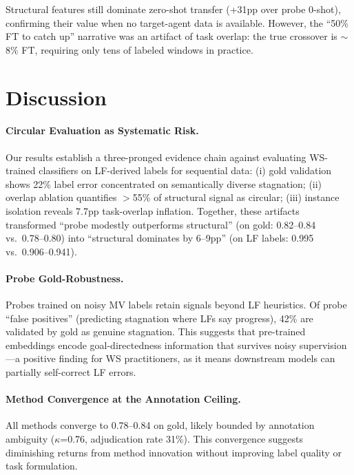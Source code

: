 \documentclass[11pt,a4paper]{article}
\begin{document}
Structural features still dominate zero-shot transfer (+31pp over probe 0-shot), confirming their value when no target-agent data is available.
However, the ``50\% FT to catch up'' narrative was an artifact of task overlap: the true crossover is $\sim$8\% FT, requiring only tens of labeled windows in practice.

\section{Discussion}
\label{sec:discussion}

\paragraph{Circular Evaluation as Systematic Risk.}
Our results establish a three-pronged evidence chain against evaluating WS-trained classifiers on LF-derived labels for sequential data:
(i) gold validation shows 22\% label error concentrated on semantically diverse stagnation;
(ii) overlap ablation quantifies $>$55\% of structural signal as circular;
(iii) instance isolation reveals 7.7pp task-overlap inflation.
Together, these artifacts transformed ``probe modestly outperforms structural'' (on gold: 0.82--0.84 vs.\ 0.78--0.80) into ``structural dominates by 6--9pp'' (on LF labels: 0.995 vs.\ 0.906--0.941).

\paragraph{Probe Gold-Robustness.}
Probes trained on noisy MV labels retain signals beyond LF heuristics.
Of probe ``false positives'' (predicting stagnation where LFs say progress), 42\% are validated by gold as genuine stagnation.
This suggests that pre-trained embeddings encode goal-directedness information that survives noisy supervision---a positive finding for WS practitioners, as it means downstream models can partially self-correct LF errors.

\paragraph{Method Convergence at the Annotation Ceiling.}
All methods converge to 0.78--0.84 on gold, likely bounded by annotation ambiguity ($\kappa$=0.76, adjudication rate 31\%).
This convergence suggests diminishing returns from method innovation without improving label quality or task formulation.
\end{document}
